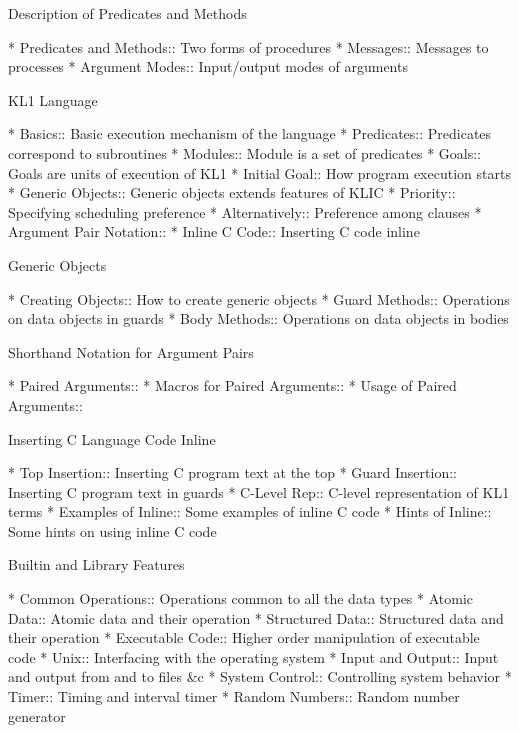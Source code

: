 Description of Predicates and Methods

* Predicates and Methods::      Two forms of procedures
* Messages::                    Messages to processes
* Argument Modes::              Input/output modes of arguments

KL1 Language

* Basics::                      Basic execution mechanism of the language
* Predicates::                  Predicates correspond to subroutines
* Modules::                     Module is a set of predicates
* Goals::                       Goals are units of execution of KL1
* Initial Goal::                How program execution starts
* Generic Objects::             Generic objects extends features of KLIC
* Priority::                    Specifying scheduling preference
* Alternatively::               Preference among clauses
* Argument Pair Notation::      
* Inline C Code::               Inserting C code inline

Generic Objects

* Creating Objects::            How to create generic objects
* Guard Methods::               Operations on data objects in guards
* Body Methods::                Operations on data objects in bodies

Shorthand Notation for Argument Pairs

* Paired Arguments::            
* Macros for Paired Arguments::  
* Usage of Paired Arguments::   

Inserting C Language Code Inline

* Top Insertion::               Inserting C program text at the top
* Guard Insertion::             Inserting C program text in guards
* C-Level Rep::                 C-level representation of KL1 terms
* Examples of Inline::          Some examples of inline C code
* Hints of Inline::             Some hints on using inline C code

Builtin and Library Features

* Common Operations::           Operations common to all the data types
* Atomic Data::                 Atomic data and their operation
* Structured Data::             Structured data and their operation
* Executable Code::             Higher order manipulation of executable code
* Unix::                        Interfacing with the operating system
* Input and Output::            Input and output from and to files &c
* System Control::              Controlling system behavior
* Timer::                       Timing and interval timer
* Random Numbers::              Random number generator

